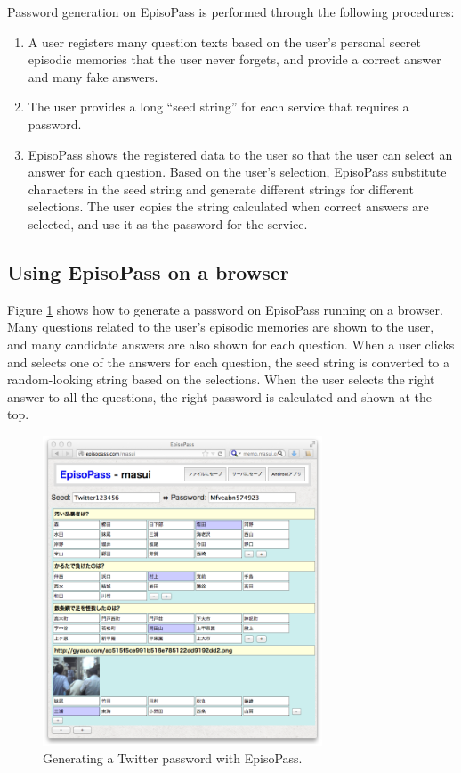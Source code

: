 \documentclass{article}
\begin{document}
Password generation on EpisoPass is performed through the following procedures:

\begin{enumerate}
\item A user registers many question texts based on the user's personal
secret episodic memories that the user never forgets,
and provide a correct answer and many fake answers.

\item The user provides a long ``seed string'' for each service that requires
a password.

\item EpisoPass shows the registered data to the user so that
the user can select an answer for each question.
Based on the user's selection,
EpisoPass substitute characters in the seed string and generate different
strings for different selections.
The user copies the string calculated when correct answers are selected,
and use it as the password for the service.
\end{enumerate}

\subsection{Using EpisoPass on a browser}

Figure \ref{web1} shows how to generate a password
on EpisoPass running on a browser.
Many questions related to the user's episodic memories are shown to the user,
and many candidate answers are also shown for each question.
When a user clicks and selects one of the answers for each question,
the seed string is converted to a random-looking string
based on the selections.
When the user selects the right answer to all the questions,
the right password is calculated and shown at the top.


\begin{figure}[H]
\centerline{\includegraphics[width=83mm,bb=0 0 718 796]{../WISS/figures/785ff09b4233804d2ec89c3af71ee5d0.png}}
\caption{Generating a Twitter password with EpisoPass.}
\label{web1}
\end{figure}
\end{document}
